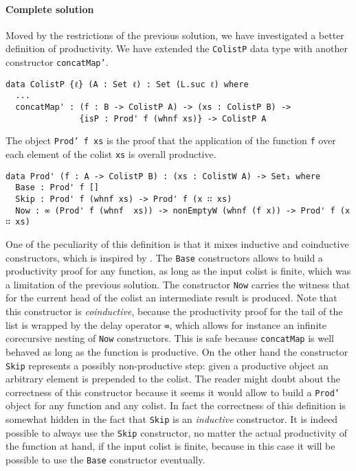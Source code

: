 \documentclass[10pt,a4paper]{article}
\begin{document}
\paragraph{Complete solution}
Moved by the restrictions of the previous solution, we have investigated a better definition of productivity.
We have extended the \texttt{ColistP} data type with another constructor \texttt{concatMap'}.
\begin{verbatim}
data ColistP {ℓ} (A : Set ℓ) : Set (L.suc ℓ) where
  ...
  concatMap' : (f : B -> ColistP A) -> (xs : ColistP B) -> 
               {isP : Prod' f (whnf xs)} -> ColistP A
\end{verbatim}
The object \texttt{Prod' f xs} is the proof that the application of the function \texttt{f} over each element of the colist \texttt{xs} is overall productive.
\begin{verbatim}
data Prod' (f : A -> ColistP B) : (xs : ColistW A) -> Set₁ where
  Base : Prod' f []
  Skip : Prod' f (whnf xs) -> Prod' f (x ∷ xs)
  Now : ∞ (Prod' f (whnf  xs)) -> nonEmptyW (whnf (f x)) -> Prod' f (x ∷ xs)
\end{verbatim}
One of the peculiarity of this definition is that it mixes inductive and coinductive constructors, which is inspired by \cite{DAN09}.
The \texttt{Base} constructors allows to build a productivity proof for any
function, as long as the input colist is finite, which was a limitation of the previous solution.
The constructor \texttt{Now} carries the witness that for the current head of the colist an intermediate result is produced. Note that this constructor is \emph{coinductive}, because the productivity proof for the tail of the list is wrapped by the delay operator \texttt{∞}, which allows for instance an infinite corecursive nesting of \texttt{Now} constructors. This is safe because \texttt{concatMap} is well behaved as long as the function is productive.
On the other hand the constructor \texttt{Skip} represents a possibly non-productive step: given a productive object an arbitrary element is prepended to the colist. The reader might doubt about the correctness of this constructor	 because it seems it would allow to build a \texttt{Prod'} object for any function and any colist.
In fact the correctness of this definition is somewhat hidden in the fact that \texttt{Skip} is an \emph{inductive} constructor. 
It is indeed possible to always use the \texttt{Skip} constructor, no matter the actual productivity of the function at hand, if the input colist is finite, because in this case it will be possible to use the \texttt{Base} constructor eventually.
\end{document}
